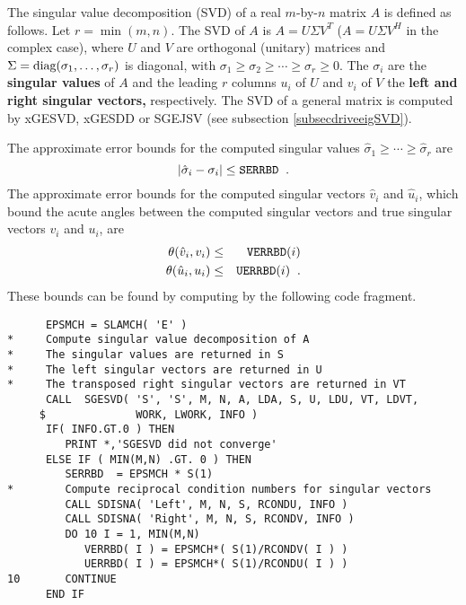 The singular value decomposition (SVD) of a
real $m$-by-$n$ matrix $A$ is defined as follows. Let $r = \min (m,n)$.
The SVD of $A$ is $A=U \Sigma V^T$ ($A=U \Sigma V^H$ in the complex case),
where
$U$ and $V$ are orthogonal (unitary) matrices and
$\Sigma = {\mbox {\rm diag}} ( \sigma_1 , \ldots , \sigma_{r} )$ is diagonal,
with $\sigma_1 \geq \sigma_2 \geq \cdots \geq \sigma_{r} \geq 0$.
The $\sigma_i$ are the {\bf singular values} of $A$ and the leading
$r$ columns $u_i$ of $U$ and $v_i$ of $V$ the
{\bf left and right singular vectors,} respectively.
The SVD of a general matrix is computed by xGESVD, xGESDD or SGEJSV
(see subsection \ref{subsecdriveeigSVD}).

The approximate error bounds
for the computed singular values
$\hat{\sigma}_1 \geq \cdots \geq \hat{\sigma}_{r}$ are
\[
| \hat{\sigma}_i - \sigma_i | \leq {\tt SERRBD} \; \; .
\]
The approximate error bounds for the computed singular vectors
$\hat{v}_i$ and $\hat{u}_i$,
which bound the acute angles between the computed singular vectors and true
singular vectors $v_i$ and $u_i$, are
\begin{eqnarray*}
\theta ( \hat{v}_i , v_i ) & \leq & {\tt VERRBD}(i) \\
\theta ( \hat{u}_i , u_i ) & \leq & {\tt UERRBD}(i) \; \; .
\end{eqnarray*}
These bounds can be found by computing by the following code fragment.

\begin{verbatim}
      EPSMCH = SLAMCH( 'E' )
*     Compute singular value decomposition of A
*     The singular values are returned in S
*     The left singular vectors are returned in U
*     The transposed right singular vectors are returned in VT
      CALL  SGESVD( 'S', 'S', M, N, A, LDA, S, U, LDU, VT, LDVT,
     $              WORK, LWORK, INFO )
      IF( INFO.GT.0 ) THEN
         PRINT *,'SGESVD did not converge'
      ELSE IF ( MIN(M,N) .GT. 0 ) THEN
         SERRBD  = EPSMCH * S(1)
*        Compute reciprocal condition numbers for singular vectors
         CALL SDISNA( 'Left', M, N, S, RCONDU, INFO )
         CALL SDISNA( 'Right', M, N, S, RCONDV, INFO )
         DO 10 I = 1, MIN(M,N)
            VERRBD( I ) = EPSMCH*( S(1)/RCONDV( I ) )
            UERRBD( I ) = EPSMCH*( S(1)/RCONDU( I ) )
10       CONTINUE
      END IF
\end{verbatim}

